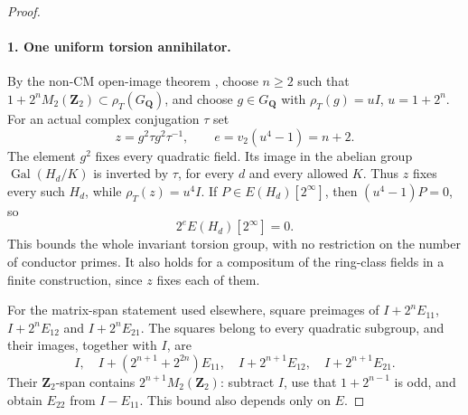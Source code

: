 \documentclass[11pt]{article}
\theoremstyle{definition}
\theoremstyle{remark}
\begin{document}
\begin{proof}\leavevmode
\paragraph{1. One uniform torsion annihilator.}
By the non-CM open-image theorem \cite{serre}, choose $n\ge2$ such that
$1+2^nM_2(\mathbf Z_2)\subset\rho_T(G_{\mathbf Q})$, and choose
$g\in G_{\mathbf Q}$ with $\rho_T(g)=uI$, $u=1+2^n$.
For an actual complex conjugation $\tau$ set
\[
 z=g^2\tau g^2\tau^{-1},\qquad e=v_2(u^4-1)=n+2.       \tag{H1}
\]
The element $g^2$ fixes every quadratic field. Its image in the
abelian group $\operatorname{Gal}(H_d/K)$ is inverted by $\tau$,
for every $d$ and every allowed $K$. Thus $z$ fixes every such
$H_d$, while $\rho_T(z)=u^4I$. If $P\in E(H_d)[2^\infty]$,
then $(u^4-1)P=0$, so
\[
                       2^e E(H_d)[2^\infty]=0.          \tag{H2}
\]
This bounds the whole invariant torsion group, with no restriction
on the number of conductor primes. It also holds for a compositum
of the ring-class fields in a finite construction, since $z$ fixes
each of them.

For the matrix-span statement used elsewhere, square preimages of
$I+2^nE_{11}$, $I+2^nE_{12}$ and $I+2^nE_{21}$. The squares belong
to every quadratic subgroup, and their images, together with $I$,
are
\[
 I,\quad I+(2^{n+1}+2^{2n})E_{11},\quad
 I+2^{n+1}E_{12},\quad I+2^{n+1}E_{21}.
\]
Their $\mathbf Z_2$-span contains $2^{n+1}M_2(\mathbf Z_2)$:
subtract $I$, use that $1+2^{n-1}$ is odd, and obtain $E_{22}$
from $I-E_{11}$. This bound also depends only on $E$.


\end{proof}
\end{document}
